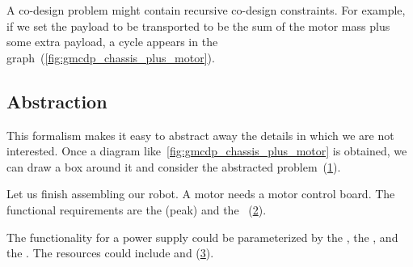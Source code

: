 \begin{example}
	A co-design problem might contain recursive co-design constraints.
	For example, if we set the payload to be transported to be the sum of the motor mass plus some extra payload, a cycle appears in the graph~(\cref{fig:gmcdp_chassis_plus_motor}).

	\begin{figure*}[h!]
		\centering
		\caption{}
		\label{fig:gmcdp_chassis_plus_motor}
	\end{figure*}

	\FloatBarrier \vfill\clearpage

	\subsection{Abstraction}
	This formalism makes it easy to abstract away the details in which we are not interested.
	Once a diagram like~\cref{fig:gmcdp_chassis_plus_motor} is obtained, we can draw a box around it and consider the abstracted problem~(\cref{fig:gmcdp_chassis_plus_motor-1}).

	\begin{figure}[h!]
		\centering
		\caption{}
		\label{fig:gmcdp_chassis_plus_motor-1}
	\end{figure}


	\label{exa:finish}
	Let us finish assembling our robot.
	A motor needs a motor control board.
	The functional requirements are the (peak)
	 and the ~(\cref{fig:mcb}).

	\begin{figure}[h!]
		\centering
		\caption{}
		\label{fig:mcb}
	\end{figure}


	The functionality for a power supply could be parameterized by the , the , and the .
	The resources could include  and  (\cref{fig:example-ba}).

	\begin{figure}[h!]
		\centering
		\caption{}
		\label{fig:example-ba}
	\end{figure}


\end{example}
